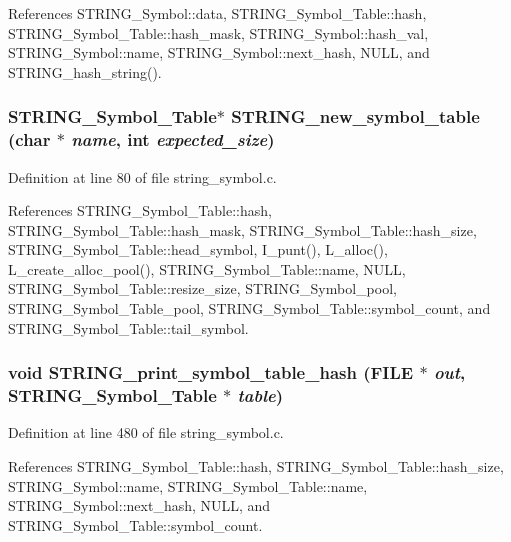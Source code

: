 References STRING\_\-Symbol::data, STRING\_\-Symbol\_\-Table::hash, STRING\_\-Symbol\_\-Table::hash\_\-mask, STRING\_\-Symbol::hash\_\-val, STRING\_\-Symbol::name, STRING\_\-Symbol::next\_\-hash, NULL, and STRING\_\-hash\_\-string().
\subsubsection{\setlength{\rightskip}{0pt plus 5cm}\bf{STRING\_\-Symbol\_\-Table}$\ast$ STRING\_\-new\_\-symbol\_\-table (char $\ast$ {\em name}, int {\em expected\_\-size})}\label{string__symbol_8h_28305366471c84770b5d9e0a2de17974}




Definition at line 80 of file string\_\-symbol.c.

References STRING\_\-Symbol\_\-Table::hash, STRING\_\-Symbol\_\-Table::hash\_\-mask, STRING\_\-Symbol\_\-Table::hash\_\-size, STRING\_\-Symbol\_\-Table::head\_\-symbol, I\_\-punt(), L\_\-alloc(), L\_\-create\_\-alloc\_\-pool(), STRING\_\-Symbol\_\-Table::name, NULL, STRING\_\-Symbol\_\-Table::resize\_\-size, STRING\_\-Symbol\_\-pool, STRING\_\-Symbol\_\-Table\_\-pool, STRING\_\-Symbol\_\-Table::symbol\_\-count, and STRING\_\-Symbol\_\-Table::tail\_\-symbol.
\subsubsection{\setlength{\rightskip}{0pt plus 5cm}void STRING\_\-print\_\-symbol\_\-table\_\-hash (FILE $\ast$ {\em out}, \bf{STRING\_\-Symbol\_\-Table} $\ast$ {\em table})}\label{string__symbol_8h_e22aa760f6c87bdf0b00b5df83b11961}




Definition at line 480 of file string\_\-symbol.c.

References STRING\_\-Symbol\_\-Table::hash, STRING\_\-Symbol\_\-Table::hash\_\-size, STRING\_\-Symbol::name, STRING\_\-Symbol\_\-Table::name, STRING\_\-Symbol::next\_\-hash, NULL, and STRING\_\-Symbol\_\-Table::symbol\_\-count.